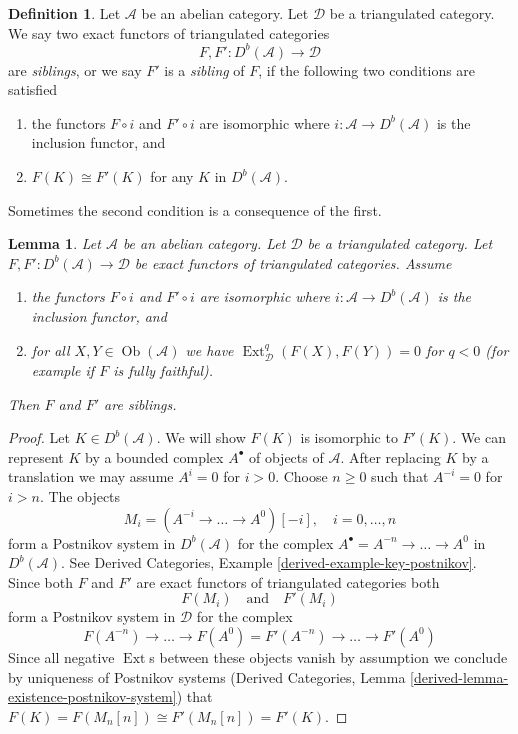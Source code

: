 \documentclass{stacks-project}
\theoremstyle{plain}
\newtheorem{lemma}[subsection]{Lemma}
\theoremstyle{definition}
\newtheorem{definition}[subsection]{Definition}
\theoremstyle{remark}
\numberwithin{equation}{subsection}
\def\Ext{\mathop{\mathrm{Ext}}\nolimits}
\def\Ob{\mathop{\mathrm{Ob}}\nolimits}
\begin{document}
\begin{definition}
\label{definition-siblings}
Let $\mathcal{A}$ be an abelian category. Let $\mathcal{D}$ be a
triangulated category. We say two exact functors of triangulated categories
$$
F, F' : D^b(\mathcal{A}) \longrightarrow \mathcal{D}
$$
are {\it siblings}, or we say $F'$ is a {\it sibling} of $F$,
if the following two conditions are satisfied
\begin{enumerate}
\item the functors $F \circ i$ and $F' \circ i$ are isomorphic
where $i : \mathcal{A} \to D^b(\mathcal{A})$ is the inclusion functor, and
\item $F(K) \cong F'(K)$ for any $K$ in $D^b(\mathcal{A})$.
\end{enumerate}
\end{definition}

\noindent
Sometimes the second condition is a consequence of the first.

\begin{lemma}
\label{lemma-sibling-fully-faithful}
Let $\mathcal{A}$ be an abelian category. Let $\mathcal{D}$ be a
triangulated category. Let
$F, F' : D^b(\mathcal{A}) \longrightarrow \mathcal{D}$
be exact functors of triangulated categories. Assume
\begin{enumerate}
\item the functors $F \circ i$ and $F' \circ i$ are isomorphic
where $i : \mathcal{A} \to D^b(\mathcal{A})$ is the inclusion functor, and
\item for all $X, Y \in \Ob(\mathcal{A})$ we have
$\Ext^q_\mathcal{D}(F(X), F(Y)) = 0$ for $q < 0$ (for example
if $F$ is fully faithful).
\end{enumerate}
Then $F$ and $F'$ are siblings.
\end{lemma}

\begin{proof}
Let $K \in D^b(\mathcal{A})$. We will show $F(K)$ is isomorphic to $F'(K)$.
We can represent $K$ by a bounded complex $A^\bullet$ of objects of
$\mathcal{A}$. After replacing $K$ by a translation we may
assume $A^i = 0$ for $i > 0$. Choose $n \geq 0$ such that $A^{-i} = 0$
for $i > n$. The objects
$$
M_i = (A^{-i} \to \ldots \to A^0)[-i],\quad i = 0, \ldots, n
$$
form a Postnikov system in $D^b(\mathcal{A})$ for the complex
$A^\bullet = A^{-n} \to \ldots \to A^0$ in $D^b(\mathcal{A})$.
See Derived Categories, Example \ref{derived-example-key-postnikov}.
Since both $F$ and $F'$ are exact functors of triangulated categories both
$$
F(M_i)
\quad\text{and}\quad
F'(M_i)
$$
form a Postnikov system in $\mathcal{D}$ for the complex
$$
F(A^{-n}) \to \ldots \to F(A^0) =
F'(A^{-n}) \to \ldots \to F'(A^0)
$$
Since all negative $\Ext$s between these objects vanish by assumption
we conclude by uniqueness of Postnikov systems
(Derived Categories, Lemma \ref{derived-lemma-existence-postnikov-system})
that $F(K) = F(M_n[n]) \cong F'(M_n[n]) = F'(K)$.
\end{proof}
\end{document}
